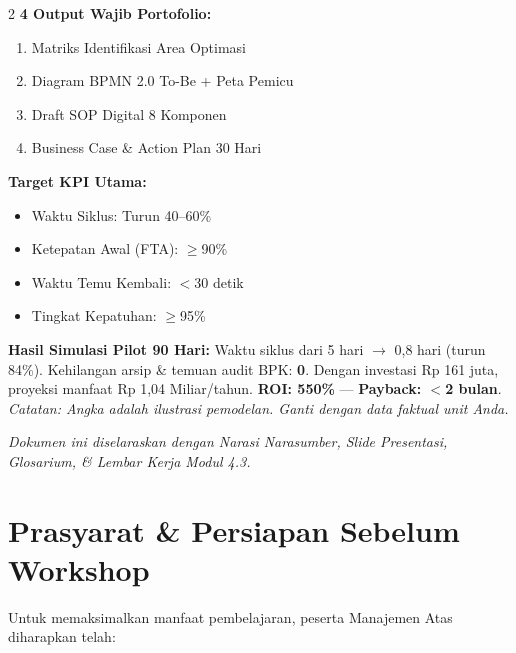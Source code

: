 \documentclass[11pt,a4paper]{article}
\begin{document}
\vspace{0.3cm}
\begin{multicols}{2}
\small
\textbf{4 Output Wajib Portofolio:}
\begin{enumerate}[nosep, leftmargin=*]
    \item Matriks Identifikasi Area Optimasi
    \item Diagram BPMN 2.0 To-Be + Peta Pemicu
    \item Draft SOP Digital 8 Komponen
    \item Business Case \& Action Plan 30 Hari
\end{enumerate}

\columnbreak

\textbf{Target KPI Utama:}
\begin{itemize}[nosep, leftmargin=*]
    \item Waktu Siklus: Turun 40--60\%
    \item Ketepatan Awal (FTA): $\geq$90\%
    \item Waktu Temu Kembali: $<$30 detik
    \item Tingkat Kepatuhan: $\geq$95\%
\end{itemize}
\end{multicols}

\begin{casebox}
\small
\textbf{Hasil Simulasi Pilot 90 Hari:} Waktu siklus dari 5 hari $\rightarrow$ 0,8 hari (turun 84\%). Kehilangan arsip \& temuan audit BPK: \textbf{0}. Dengan investasi Rp 161 juta, proyeksi manfaat Rp 1,04 Miliar/tahun. \textbf{ROI: 550\%} --- \textbf{Payback: $<$2 bulan}.
\textit{Catatan: Angka adalah ilustrasi pemodelan. Ganti dengan data faktual unit Anda.}
\end{casebox}

\vspace{0.3cm}
\begin{center}
\textit{Dokumen ini diselaraskan dengan Narasi Narasumber, Slide Presentasi, Glosarium, \& Lembar Kerja Modul 4.3.}
\end{center}

\newpage

\section*{Prasyarat \& Persiapan Sebelum Workshop}

Untuk memaksimalkan manfaat pembelajaran, peserta Manajemen Atas diharapkan telah:
\end{document}
